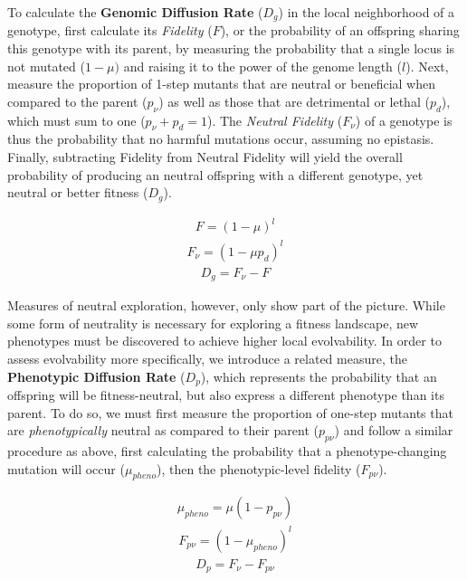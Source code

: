 \documentclass[PhD]{msu-thesis}
\begin{document}
To calculate the \textbf{Genomic Diffusion Rate} ($D_g$) in the local neighborhood of a genotype, first calculate its \textit{Fidelity} ($F$), or the probability of an offspring sharing this genotype with its parent, by measuring the probability that a single locus is not mutated ($1-\mu)$ and raising it to the power of the genome length ($l$). Next, measure the proportion of 1-step mutants that are neutral or beneficial when compared to the parent ($p_\nu$) as well as those that are detrimental or lethal ($p_d$), which must sum to one ($p_\nu + p_d = 1$). The \textit{Neutral Fidelity} ($F_\nu$) of a genotype is thus the probability that no harmful mutations occur, assuming no epistasis. Finally, subtracting Fidelity from Neutral Fidelity will yield the overall probability of producing an neutral offspring with a different genotype, yet neutral or better fitness ($D_g$).

	\begin{eqnarray}
	\label{eq:fidelity}
		F = (1 - \mu)^l
	\end{eqnarray}
	\begin{eqnarray}
	\label{eq:neutral_fidelity}
		F_\nu = (1 - \mu p_d)^l
	\end{eqnarray}
	\begin{eqnarray}
	\label{eq:genomic_diffusion_rate}
		D_g = F_\nu - F
	\end{eqnarray}

Measures of neutral exploration, however, only show part of the picture. While some form of neutrality is necessary for exploring a fitness landscape, new phenotypes must be discovered to achieve higher local evolvability. In order to assess evolvability more specifically, we introduce a related measure, the \textbf{Phenotypic Diffusion Rate} ($D_p$), which represents the probability that an offspring will be fitness-neutral, but also express a different phenotype than its parent. To do so, we must first measure the proportion of one-step mutants that are \textit{phenotypically} neutral as compared to their parent ($p_{p\nu}$) and follow a similar procedure as above, first calculating the probability that a phenotype-changing mutation will occur ($\mu_{pheno}$), then the phenotypic-level fidelity ($F_{p\nu}$).

	\begin{eqnarray}
	\label{eq:phenotypic_mutation_rate}
		\mu_{pheno} = \mu (1- p_{p\nu})
	\end{eqnarray}
	\begin{eqnarray}
	\label{eq:phenotypic_fidelity}
		F_{p\nu} = (1 - \mu_{pheno})^l
	\end{eqnarray}
	\begin{eqnarray}
	\label{eq:phenotypic_diffusion_rate}
		D_p = F_\nu - F_{p\nu}
	\end{eqnarray}
\end{document}
